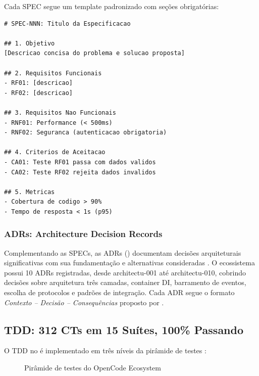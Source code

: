 Cada SPEC segue um template padronizado com seções obrigatórias:

\begin{lstlisting}[style=pythonstyle, caption={Template de SPEC},
                   label={lst:spec-template}]
# SPEC-NNN: Titulo da Especificacao

## 1. Objetivo
[Descricao concisa do problema e solucao proposta]

## 2. Requisitos Funcionais
- RF01: [descricao]
- RF02: [descricao]

## 3. Requisitos Nao Funcionais
- RNF01: Performance (< 500ms)
- RNF02: Seguranca (autenticacao obrigatoria)

## 4. Criterios de Aceitacao
- CA01: Teste RF01 passa com dados validos
- CA02: Teste RF02 rejeita dados invalidos

## 5. Metricas
- Cobertura de codigo > 90%
- Tempo de resposta < 1s (p95)
\end{lstlisting}

\subsubsection{ADRs: Architecture Decision Records}

Complementando as SPECs, as ADRs () documentam decisões arquiteturais significativas com sua
fundamentação e alternativas consideradas \cite{opencode2026ecosystem}.
O ecossistema possui 10 ADRs registradas, desde architectu-001 até
architectu-010, cobrindo decisões sobre arquitetura três camadas,
container DI, barramento de eventos, escolha de protocolos e padrões
de integração. Cada ADR segue o formato \emph{Contexto -- Decisão --
Consequências} proposto por \cite{fowler2019refactoring}.

\subsection{TDD: 312 CTs em 15 Suítes, 100\% Passando}
\label{subsec:tdd}

O TDD no \opencodeeco{} é implementado em três níveis da pirâmide de
testes \cite{beck2002tdd}:

\begin{figure}[htb]
\centering
\caption{Pirâmide de testes do OpenCode Ecosystem}
\label{fig:piramide-testes}
\end{figure}


